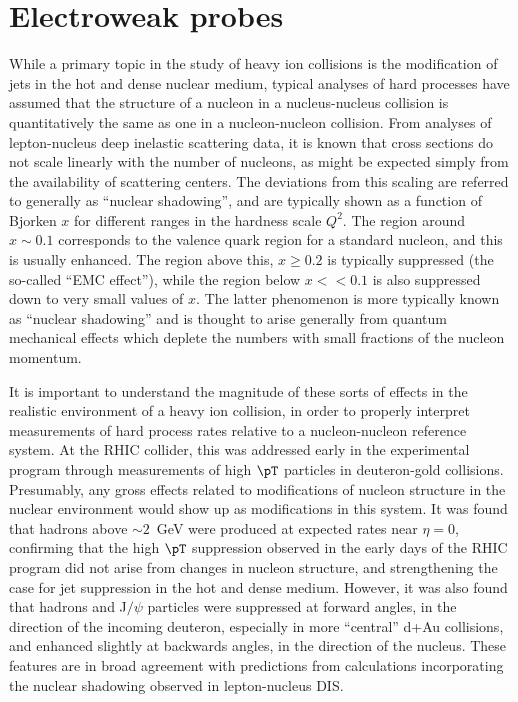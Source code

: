\section{Electroweak probes}
\label{sect:pas:ew}

While a primary topic in the study of heavy ion collisions is the modification
of jets in the hot and dense nuclear medium, typical analyses of
hard processes have assumed that the
structure of a nucleon in a nucleus-nucleus collision is quantitatively the
same as one in a nucleon-nucleon collision.
From analyses of lepton-nucleus deep inelastic scattering data,
it is known that cross sections do not scale linearly with the number of nucleons,
as might be expected simply from the availability of scattering centers.
The deviations from this scaling are referred to generally as ``nuclear shadowing'',
and are typically shown as a function of Bjorken $x$ for different ranges in the
hardness scale $Q^2$.
The region around $x \sim 0.1$ corresponds to the valence quark region for a standard
nucleon, and this is usually enhanced.  The region above this, $x \geq 0.2$ is typically
suppressed (the so-called ``EMC effect''), while the region below $x << 0.1$ is also
suppressed down to very small values of $x$.  The latter phenomenon is more
typically known as ``nuclear shadowing'' and is thought to arise generally from
quantum mechanical effects which deplete the numbers with small fractions of the
nucleon momentum.

It is important to understand the magnitude of these sorts of effects in
the realistic environment of a heavy ion collision, in order to properly interpret
measurements of hard process rates relative to a nucleon-nucleon reference system.
At the RHIC collider, this was addressed early in the experimental program
through measurements of high $\pT$ particles in deuteron-gold collisions.
Presumably, any gross effects related to modifications of nucleon structure in the
nuclear environment would show up as modifications in this system.  It was found that
hadrons above $\sim 2$~GeV were produced at expected rates near $\eta =0$, confirming that
the high $\pT$ suppression observed in the early days of the RHIC program did not
arise from changes in nucleon structure, and strengthening the case for jet suppression
in the hot and dense medium.
However, it was also found that hadrons and J$/\psi$ particles were suppressed at
forward angles, in the direction of the incoming deuteron, especially in more ``central''
d+Au collisions, and enhanced slightly at backwards angles, in the direction of the
nucleus.  These features are in broad agreement with predictions from calculations
incorporating the nuclear shadowing observed in lepton-nucleus DIS.

